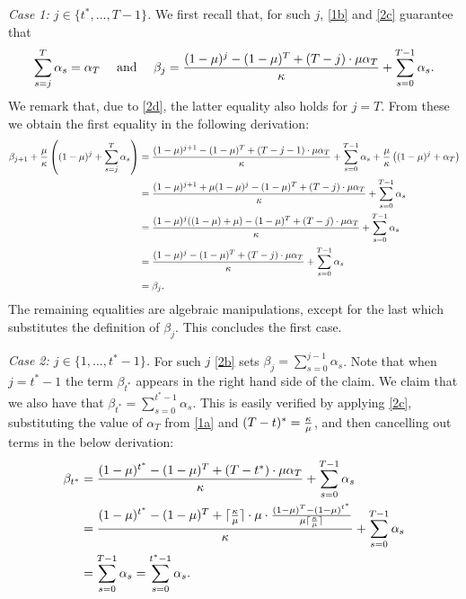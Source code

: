      
    
\emph{Case 1: $j\in\{t^*, \ldots, T-1\}$.} We first recall that, for such $j$, \eqref{1b} and \eqref{2c} guarantee that $$\sum_{s=j}^T \alpha_s = \alpha_T\quad\text{ and }\quad\beta_j = \frac{(1-\mu)^j - (1-\mu)^T + (T-j) \cdot \mu \alpha_T}{\kappa} + \sum_{s=0}^{T-1} \alpha_s.$$ 
We remark that, due to \eqref{2d}, the latter equality also holds for $j=T$.
From these we obtain the first equality in the following derivation:
        \begin{align*}
            \beta_{j+1} + \frac{\mu}{\kappa} \left( (1-\mu)^j + \sum_{s=j}^T \alpha_s \right) &=  \frac{(1-\mu)^{j+1} - (1-\mu)^T + (T-j-1) \cdot \mu \alpha_T}{\kappa} + \sum_{s=0}^{T-1} \alpha_s  + \frac{\mu}{\kappa} \left( (1-\mu)^j + \alpha_T \right)\\
            &= \frac{(1-\mu)^{j+1} + \mu (1-\mu)^j - (1-\mu)^T + (T-j) \cdot \mu \alpha_T}{\kappa}+  \sum_{s=0}^{T-1} \alpha_s\\
            &=  \frac{(1-\mu)^{j} ((1-\mu) + \mu) - (1-\mu)^T + (T-j) \cdot \mu \alpha_T}{\kappa}+  \sum_{s=0}^{T-1} \alpha_s\\
            &= \frac{(1-\mu)^{j} - (1-\mu)^T + (T-j) \cdot \mu \alpha_T}{\kappa}+  \sum_{s=0}^{T-1} \alpha_s\\
            &= \beta_j.
        \end{align*}
        The remaining equalities are algebraic manipulations, except for the last which substitutes the definition of $\beta_j$. This concludes the first case.

\emph{Case 2: $j \in \{1, \ldots, {t^*-1}\}$.} For such $j$ \eqref{2b} sets $\beta_j = \sum_{s=0}^{j-1} \alpha_s$. Note that when $j=t^*-1$ the term $\beta_{t^*}$ appears in the right hand side of the claim. We claim that we also have that $\beta_{t^*} = \sum_{s=0}^{t^*-1}\alpha_s$. This is easily verified by applying \eqref{2c}, substituting the value of $\alpha_T$ from \eqref{1a} and $(T-t)^*=\frac{\kappa}{\mu}$, and then cancelling out terms in the below derivation:
        \begin{align*}
            \beta_{t^*} &= \frac{(1-\mu)^{t^*} - (1-\mu)^T + (T-t^*) \cdot \mu \alpha_T}{\kappa} + \sum_{s=0}^{T-1} \alpha_s\\
            &= \frac{(1-\mu)^{t^*} - (1-\mu)^T + \lceil \frac{\kappa}{\mu} \rceil \cdot \mu \cdot \frac{ (1-\mu)^T - (1-\mu)^{t^*} }{\mu \lceil \frac{\kappa}{\mu}\rceil}}{\kappa}  + \sum_{s=0}^{T-1} \alpha_s\\
            &=   \sum_{s=0}^{T-1} \alpha_s= \sum_{s=0}^{t^*-1} \alpha_s.
        \end{align*}
        
